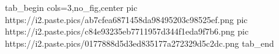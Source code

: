  
 
 
 
 
\zzSecCmtScr

\ifcmt
  tab_begin cols=3,no_fig,center
     pic https://i2.paste.pics/ab7cfea6871458da98495203c98525ef.png
     pic https://i2.paste.pics/c84e93235eb7711957d344f1eda9f7b6.png
     pic https://i2.paste.pics/0177888d5d3ed835177a272329d5c2dc.png
  tab_end
\fi

